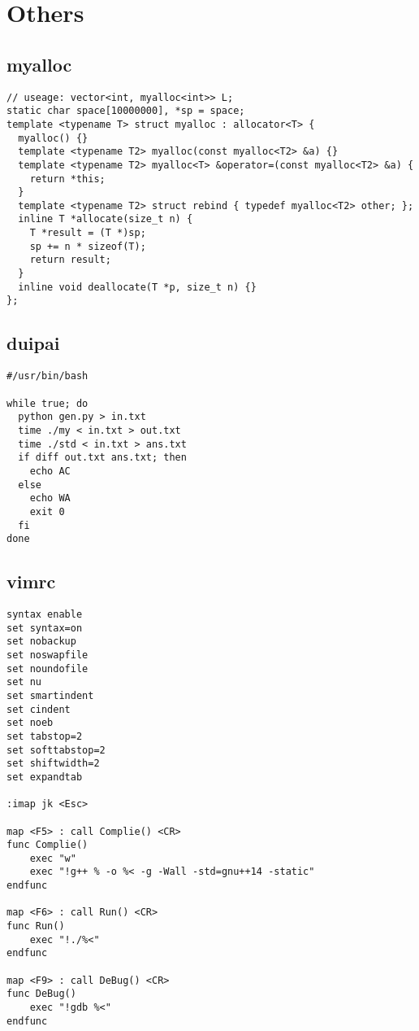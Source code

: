 \documentclass[twoside]{article}
\begin{document}
\section{Others}

\subsection{myalloc}
\begin{lstlisting}
// useage: vector<int, myalloc<int>> L;
static char space[10000000], *sp = space;
template <typename T> struct myalloc : allocator<T> {
  myalloc() {}
  template <typename T2> myalloc(const myalloc<T2> &a) {}
  template <typename T2> myalloc<T> &operator=(const myalloc<T2> &a) {
    return *this;
  }
  template <typename T2> struct rebind { typedef myalloc<T2> other; };
  inline T *allocate(size_t n) {
    T *result = (T *)sp;
    sp += n * sizeof(T);
    return result;
  }
  inline void deallocate(T *p, size_t n) {}
};

\end{lstlisting}
\subsection{duipai}
\begin{lstlisting}
#/usr/bin/bash

while true; do
  python gen.py > in.txt
  time ./my < in.txt > out.txt
  time ./std < in.txt > ans.txt
  if diff out.txt ans.txt; then
    echo AC
  else
    echo WA
    exit 0
  fi
done

\end{lstlisting}
\subsection{vimrc}
\begin{lstlisting}
syntax enable
set syntax=on
set nobackup
set noswapfile
set noundofile
set nu
set smartindent
set cindent
set noeb
set tabstop=2
set softtabstop=2
set shiftwidth=2
set expandtab

:imap jk <Esc>

map <F5> : call Complie() <CR>
func Complie()
	exec "w"
	exec "!g++ % -o %< -g -Wall -std=gnu++14 -static"
endfunc

map <F6> : call Run() <CR>
func Run()
	exec "!./%<"
endfunc

map <F9> : call DeBug() <CR>
func DeBug()
	exec "!gdb %<"
endfunc

\end{lstlisting}
\end{document}
